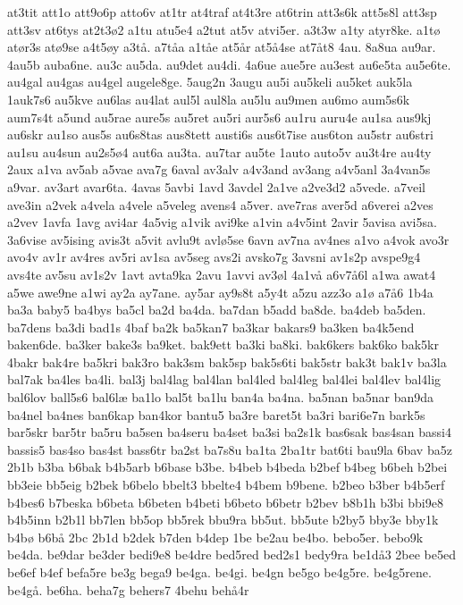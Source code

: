 {at3tit
att1o
att9o6p
atto6v
at1tr
at4traf
at4t3re
at6trin
att3s6k
att5s8l
att3sp
att3sv
at6tys
at2t3^^f82
a1tu
atu5e4
a2tut
at5v
atvi5er.
a3t3w
a1ty
atyr8ke.
a1t^^f8
at^^f8r3s
at^^f89se
a4t5^^f8y
a3t^^e5.
a7t^^e5a
a1t^^e5e
at5^^e5r
at5^^e54se
at7^^e5t8
4au.
8a8ua
au9ar.
4au5b
auba6ne.
au3c
au5da.
au9det
au4di.
4a6ue
aue5re
au3est
au6e5ta
au5e6te.
au4gal
au4gas
au4gel
augele8ge.
5aug2n
3augu
au5i
au5keli
au5ket
auk5la
1auk7s6
au5kve
au6las
au4lat
aul5l
aul8la
au5lu
au9men
au6mo
aum5s6k
aum7s4t
a5und
au5rae
aure5s
au5ret
au5ri
aur5s6
au1ru
auru4e
au1sa
aus9kj
au6skr
au1so
aus5s
au6s8tas
aus8tett
austi6s
aus6t7ise
aus6ton
au5str
au6stri
au1su
au4sun
au2s5^^f84
aut6a
au3ta.
au7tar
au5te
1auto
auto5v
au3t4re
au4ty
2aux
a1va
av5ab
a5vae
ava7g
6aval
av3alv
a4v3and
av3ang
a4v5anl
3a4van5s
a9var.
av3art
avar6ta.
4avas
5avbi
1avd
3avdel
2a1ve
a2ve3d2
a5vede.
a7veil
ave3in
a2vek
a4vela
a4vele
a5veleg
avens4
a5ver.
ave7ras
aver5d
a6verei
a2ves
a2vev
1avfa
1avg
avi4ar
4a5vig
a1vik
avi9ke
a1vin
a4v5int
2avir
5avisa
avi5sa.
3a6vise
av5ising
avis3t
a5vit
avlu9t
avl^^f85se
6avn
av7na
av4nes
a1vo
a4vok
avo3r
avo4v
av1r
av4res
av5ri
av1sa
av5seg
avs2i
avsko7g
3avsni
av1s2p
avspe9g4
avs4te
av5su
av1s2v
1avt
avta9ka
2avu
1avvi
av3^^f8l
4a1v^^e5
a6v7^^e56l
a1wa
awat4
a5we
awe9ne
a1wi
ay2a
ay7ane.
ay5ar
ay9s8t
a5y4t
a5zu
azz3o
a1^^f8
a7^^e56
1b4a
ba3a
baby5
ba4bys
ba5cl
ba2d
ba4da.
ba7dan
b5add
ba8de.
ba4deb
ba5den.
ba7dens
ba3di
bad1s
4baf
ba2k
ba5kan7
ba3kar
bakars9
ba3ken
ba4k5end
baken6de.
ba3ker
bake3s
ba9ket.
bak9ett
ba3ki
ba8ki.
bak6kers
bak6ko
bak5kr
4bakr
bak4re
ba5kri
bak3ro
bak3sm
bak5sp
bak5s6ti
bak5str
bak3t
bak1v
ba3la
bal7ak
ba4les
ba4li.
bal3j
bal4lag
bal4lan
bal4led
bal4leg
bal4lei
bal4lev
bal4lig
bal6lov
ball5s6
bal6l^^e6
ba1lo
bal5t
ba1lu
ban4a
ba4na.
ba5nan
ba5nar
ban9da
ba4nel
ba4nes
ban6kap
ban4kor
bantu5
ba3re
baret5t
ba3ri
bari6e7n
bark5s
bar5skr
bar5tr
ba5ru
ba5sen
ba4seru
ba4set
ba3si
ba2s1k
bas6sak
bas4san
bassi4
bassis5
bas4so
bas4st
bass6tr
ba2st
ba7s8u
ba1ta
2ba1tr
bat6ti
bau9la
6bav
ba5z
2b1b
b3ba
b6bak
b4b5arb
b6base
b3be.
b4beb
b4beda
b2bef
b4beg
b6beh
b2bei
bb3eie
bb5eig
b2bek
b6belo
bbelt3
bbelte4
b4bem
b9bene.
b2beo
b3ber
b4b5erf
b4bes6
b7beska
b6beta
b6beten
b4beti
b6beto
b6betr
b2bev
b8b1h
b3bi
bbi9e8
b4b5inn
b2b1l
bb7len
bb5op
bb5rek
bbu9ra
bb5ut.
bb5ute
b2by5
bby3e
bby1k
b4b^^f8
b6b^^e5
2bc
2b1d
b2dek
b7den
b4dep
1be
be2au
be4bo.
bebo5er.
bebo9k
be4da.
be9dar
be3der
bedi9e8
be4dre
bed5red
bed2s1
bedy9ra
be1d^^e53
2bee
be5ed
be6ef
b4ef
befa5re
be3g
bega9
be4ga.
be4gi.
be4gn
be5go
be4g5re.
be4g5rene.
be4g^^e5.
be6ha.
beha7g
behers7
4behu
beh^^e54r
}

